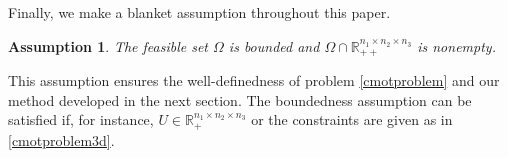 \documentclass[10pt]{article}
\newcommand{\R}{\mathbb R}
\newtheorem{assumption}{Assumption}
\begin{document}
Finally, we make a blanket assumption throughout this paper.

\begin{assumption}\label{assumpfeas}
The feasible set $\Omega$ is bounded and $\Omega\cap\mathbb{R}^{n_1 \times n_2 \times n_3}_{++}$ is nonempty.
\end{assumption}

This assumption ensures the well-definedness of problem \eqref{cmotproblem} and our method developed in the next section. The boundedness assumption can be satisfied if, for instance, $U\in \R_{+}^{n_1\times n_2\times n_3}$ or the constraints are given as in \eqref{cmotproblem3d}.

\end{document}
